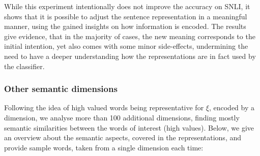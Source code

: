 \noindent
While this experiment intentionally does not improve the accuracy on \ac{SNLI}, it shows that it is possible to adjust the sentence representation in a meaningful manner, using the gained insights on how information is encoded. The results give evidence, that in the majority of cases, the new meaning corresponds to the initial intention, yet also comes with some minor side-effects, undermining the need to have a deeper understanding how the representations are in fact used by the classifier. 
\subsubsection{Other semantic dimensions}
Following the idea of high valued words being representative for $\xi$, encoded by a dimension, we analyse more than 100 additional dimensions, finding mostly semantic similarities between the words of interest (high values). Below, we give an overview about the semantic aspects, covered in the representations, and provide sample words, taken from a single dimension each time:
